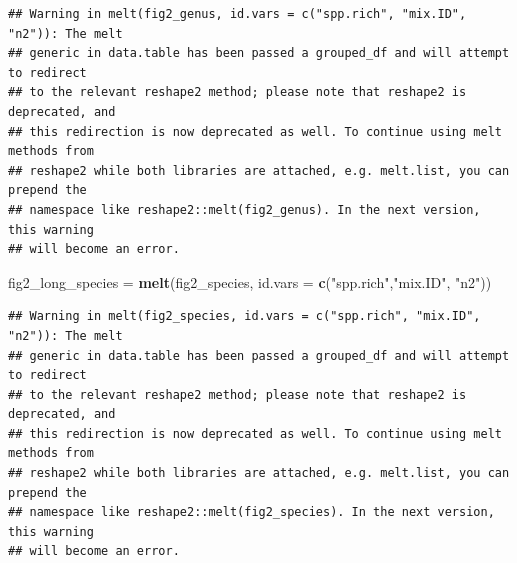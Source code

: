 \documentclass[
]{article}
\newenvironment{Shaded}{\begin{snugshade}}{\end{snugshade}}
\newcommand{\CommentTok}[1]{\textcolor[rgb]{0.56,0.35,0.01}{\textit{#1}}}
\newcommand{\DataTypeTok}[1]{\textcolor[rgb]{0.13,0.29,0.53}{#1}}
\newcommand{\KeywordTok}[1]{\textcolor[rgb]{0.13,0.29,0.53}{\textbf{#1}}}
\newcommand{\NormalTok}[1]{#1}
\newcommand{\StringTok}[1]{\textcolor[rgb]{0.31,0.60,0.02}{#1}}
\begin{document}
\begin{Shaded}
\begin{Highlighting}[]
{{{\CommentTok{#Convert from wide to long}

\CommentTok{#fig2_long_family = melt(fig2_family, id.vars = c("spp.rich","mix.ID", "n2"))}
\NormalTok{fig2_long_genus =}\StringTok{ }\KeywordTok{melt}\NormalTok{(fig2_genus, }\DataTypeTok{id.vars =} \KeywordTok{c}\NormalTok{(}\StringTok{"spp.rich"}\NormalTok{,}\StringTok{"mix.ID"}\NormalTok{, }\StringTok{"n2"}\NormalTok{))}
\end{Highlighting}
\end{Shaded}

\begin{verbatim}
## Warning in melt(fig2_genus, id.vars = c("spp.rich", "mix.ID", "n2")): The melt
## generic in data.table has been passed a grouped_df and will attempt to redirect
## to the relevant reshape2 method; please note that reshape2 is deprecated, and
## this redirection is now deprecated as well. To continue using melt methods from
## reshape2 while both libraries are attached, e.g. melt.list, you can prepend the
## namespace like reshape2::melt(fig2_genus). In the next version, this warning
## will become an error.
\end{verbatim}

\begin{Shaded}
\begin{Highlighting}[]
\NormalTok{fig2_long_species =}\StringTok{ }\KeywordTok{melt}\NormalTok{(fig2_species, }\DataTypeTok{id.vars =} \KeywordTok{c}\NormalTok{(}\StringTok{"spp.rich"}\NormalTok{,}\StringTok{"mix.ID"}\NormalTok{, }\StringTok{"n2"}\NormalTok{))}
\end{Highlighting}
\end{Shaded}

\begin{verbatim}
## Warning in melt(fig2_species, id.vars = c("spp.rich", "mix.ID", "n2")): The melt
## generic in data.table has been passed a grouped_df and will attempt to redirect
## to the relevant reshape2 method; please note that reshape2 is deprecated, and
## this redirection is now deprecated as well. To continue using melt methods from
## reshape2 while both libraries are attached, e.g. melt.list, you can prepend the
## namespace like reshape2::melt(fig2_species). In the next version, this warning
## will become an error.
\end{verbatim}
\end{document}
